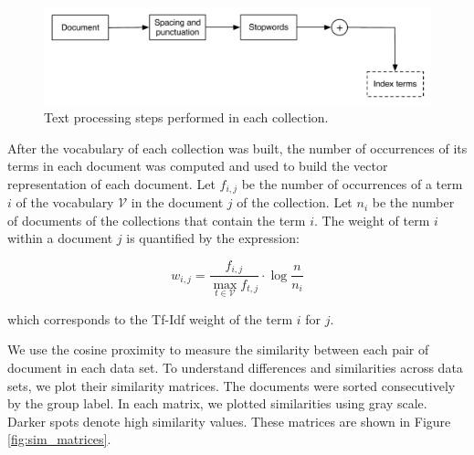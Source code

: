 \documentclass[smallextended]{svjour3}       %
\begin{document}
\begin{figure}[!htbp]
\centering
  \includegraphics[scale=0.7]
  {text_processing_steps.pdf}
  \caption{Text processing steps performed in each collection.}
  \label{fig:text_processing}
\end{figure}

After the vocabulary of each collection was built, the number of occurrences of its terms in each document was computed and used to build the vector representation of each document. 
Let $f_{i,j}$ be the number of occurrences of a term $i$ of the vocabulary $\mathcal{V}$ in the document $j$ of the collection.
Let $n_{i}$ be the number of documents of the collections that contain the term $i$.
The weight of term $i$ within a document $j$ is quantified by the expression:

\[w_{i,j}=\frac{f_{i,j}}{ \operatorname*{max}_{t\in \mathcal{V}}f_{t,j} }\cdot\log\frac{n}{n_{i}}\] 

which corresponds to the Tf-Idf weight of the term $i$ for $j$.

We use the cosine proximity to measure the similarity between each pair of document in each data set. 
To understand differences and similarities across data sets, we plot their similarity matrices.
The documents were sorted consecutively by the group label. 
In each matrix, we plotted similarities using gray scale. 
Darker spots denote high similarity values. 
These matrices are shown in Figure \ref{fig:sim_matrices}. 
\end{document}
